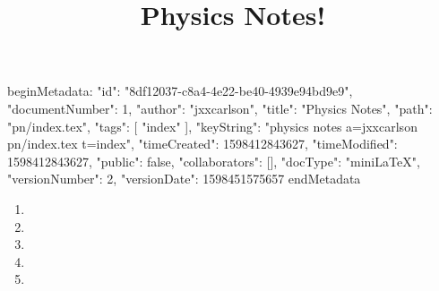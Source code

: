 beginMetadata:
{
    "id": "8df12037-c8a4-4e22-be40-4939e94bd9e9",
    "documentNumber": 1,
    "author": "jxxcarlson",
    "title": "Physics Notes",
    "path": "pn/index.tex",
    "tags": [
        "index"
    ],
    "keyString": "physics notes a=jxxcarlson pn/index.tex t=index",
    "timeCreated": 1598412843627,
    "timeModified": 1598412843627,
    "public": false,
    "collaborators": [],
    "docType": "miniLaTeX",
    "versionNumber": 2,
    "versionDate": 1598451575657
}
endMetadata
\title{Physics Notes!}

\maketitle

\begin{enumerate}

\item {}

\item {}

\item {}

\item {}

\item {}


\end{enumerate}
